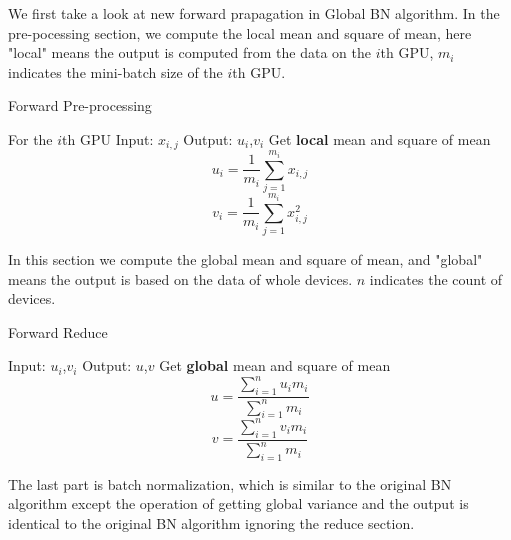 We first take a look at new forward prapagation in Global BN algorithm. In the pre-pocessing section, we compute the local mean and square of mean, here "local" means the output is computed from the data on the $i$th GPU, $m_i$ indicates the mini-batch size of the $i$th GPU. 
\begin{algorithm}[h]
    \caption{Forward Pre-processing}
    \label{alg:forward-pre}
    \begin{algorithmic}[1]
        \State For the $i$th GPU
        \State Input: $x_{i,j}$
        \State Output: $u_{i}$,$v_{i}$
        \State Get \textbf{local} mean and square of mean
        \begin{equation}
            {u_i} = \frac{1}{{{m_i}}}\sum\limits_{j = 1}^{{m_i}} {{x_{i,j}}} 
        \end{equation}
        \begin{equation}
            {v_i} = \frac{1}{{{m_i}}}\sum\limits_{j = 1}^{{m_i}} {x_{i,j}^2} 
        \end{equation}
    \end{algorithmic}
\end{algorithm}


In this section we compute the global mean and square of mean, and "global" means the output is based on the data of whole devices. $n$ indicates the count of devices.

\begin{algorithm}[h]
\caption{Forward Reduce} %
\label{alg:forward-reduce}

\begin{algorithmic}[1]
\State Input: $u_{i}$,$v_{i}$
\State Output: $u$,$v$
\State Get \textbf{global} mean and square of mean
\begin{equation}
    {u = \frac{{\sum\nolimits_{i = 1}^n {{u_i}{m_i}} }}{{\sum\nolimits_{i = 1}^n {{m_i}} }}}
\end{equation}
\begin{equation}
    {v = \frac{{\sum\nolimits_{i = 1}^n {{v_i}{m_i}} }}{{\sum\nolimits_{i = 1}^n {{m_i}} }}}
\end{equation}
\end{algorithmic}
\end{algorithm}

The last part is batch normalization, which is similar to the original BN algorithm except the operation of getting global variance and the output is identical to the original BN algorithm ignoring the reduce section.

